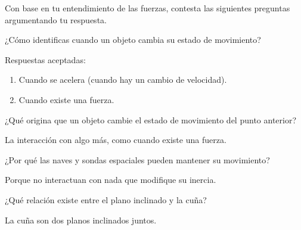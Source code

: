 Con base en tu entendimiento de las fuerzas, contesta las siguientes preguntas argumentando tu respuesta.

\begin{parts}
    ¿Cómo identificas cuando un objeto cambia su estado de movimiento?

    \begin{solutionbox}{3cm}
        Respuestas aceptadas:
        \begin{enumerate}
            \item Cuando se acelera (cuando hay un cambio de velocidad).
            \item Cuando existe una fuerza.
        \end{enumerate}
    \end{solutionbox}

    ¿Qué origina que un objeto cambie el estado de movimiento del punto anterior?

    \begin{solutionbox}{1.5cm}
        La interacción con algo más, como cuando existe una fuerza.
    \end{solutionbox}

    ¿Por qué las naves y sondas espaciales pueden mantener su movimiento?

    \begin{solutionbox}{1.5cm}
        Porque no interactuan con nada que modifique su inercia.
    \end{solutionbox}

    ¿Qué relación existe entre el plano inclinado y la cuña?

    \begin{solutionbox}{1.5cm}
        La cuña son dos planos inclinados juntos.
    \end{solutionbox}
\end{parts}